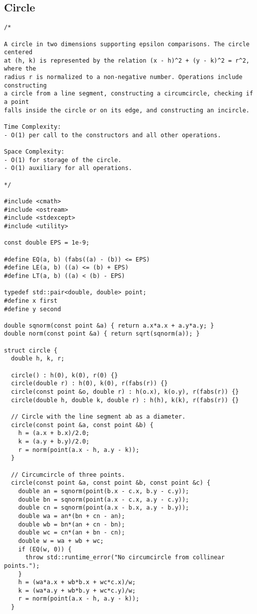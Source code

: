 \subsection{Circle}
\begin{lstlisting}
/*

A circle in two dimensions supporting epsilon comparisons. The circle centered
at (h, k) is represented by the relation (x - h)^2 + (y - k)^2 = r^2, where the
radius r is normalized to a non-negative number. Operations include constructing
a circle from a line segment, constructing a circumcircle, checking if a point
falls inside the circle or on its edge, and constructing an incircle.

Time Complexity:
- O(1) per call to the constructors and all other operations.

Space Complexity:
- O(1) for storage of the circle.
- O(1) auxiliary for all operations.

*/

#include <cmath>
#include <ostream>
#include <stdexcept>
#include <utility>

const double EPS = 1e-9;

#define EQ(a, b) (fabs((a) - (b)) <= EPS)
#define LE(a, b) ((a) <= (b) + EPS)
#define LT(a, b) ((a) < (b) - EPS)

typedef std::pair<double, double> point;
#define x first
#define y second

double sqnorm(const point &a) { return a.x*a.x + a.y*a.y; }
double norm(const point &a) { return sqrt(sqnorm(a)); }

struct circle {
  double h, k, r;

  circle() : h(0), k(0), r(0) {}
  circle(double r) : h(0), k(0), r(fabs(r)) {}
  circle(const point &o, double r) : h(o.x), k(o.y), r(fabs(r)) {}
  circle(double h, double k, double r) : h(h), k(k), r(fabs(r)) {}

  // Circle with the line segment ab as a diameter.
  circle(const point &a, const point &b) {
    h = (a.x + b.x)/2.0;
    k = (a.y + b.y)/2.0;
    r = norm(point(a.x - h, a.y - k));
  }

  // Circumcircle of three points.
  circle(const point &a, const point &b, const point &c) {
    double an = sqnorm(point(b.x - c.x, b.y - c.y));
    double bn = sqnorm(point(a.x - c.x, a.y - c.y));
    double cn = sqnorm(point(a.x - b.x, a.y - b.y));
    double wa = an*(bn + cn - an);
    double wb = bn*(an + cn - bn);
    double wc = cn*(an + bn - cn);
    double w = wa + wb + wc;
    if (EQ(w, 0)) {
      throw std::runtime_error("No circumcircle from collinear points.");
    }
    h = (wa*a.x + wb*b.x + wc*c.x)/w;
    k = (wa*a.y + wb*b.y + wc*c.y)/w;
    r = norm(point(a.x - h, a.y - k));
  }


\end{lstlisting}
